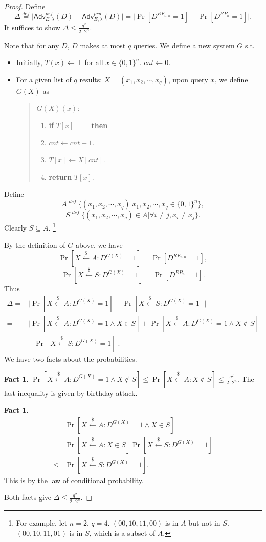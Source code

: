 \documentclass[12pt]{article}
\newcommand{\eqdef}{\stackrel{def}{=}}
\newcommand{\bits}{\{0,1\}}
\newcommand{\getsr}{\stackrel{\$}{\gets}}
\newcommand{\Adv}{\mathsf{Adv}}
\newcommand{\tab}{\hspace{0.3in}}
\theoremstyle{definition}
\newtheorem{fact}[theorem]{Fact}
\begin{document}
\begin{proof}
Define
$$
\Delta \eqdef \bigg| \Adv_{E,\lambda}^{prf}(D) - \Adv_{E,\lambda}^{prp}(D) \bigg| 
= \bigg| \Pr[D^{RF_{n,n}}=1] - \Pr[D^{RP_n}=1] \bigg|.
$$
It suffices to show $\Delta \leq \frac{q^2}{2 \cdot 2^n}$. 

Note that for any $D$, $D$ makes at most $q$ queries. We define a new system $G$ s.t.
\begin{itemize}
\item Initially, $T(x) \gets \bot$ for all $x \in \bits^n$. $cnt \gets 0$.
\item For a given list of $q$ results: $X = (x_1, x_2, \cdots, x_q)$, upon query $x$, we define $G(X)$ as
\begin{quote}
$G(X)(x)$:
\begin{enumerate}
\item {\bf if} $T[x] = \bot$ {\bf then}
\item \tab $cnt \gets cnt + 1$.
\item \tab $T[x] \gets X[cnt]$.
\item {\bf return} $T[x]$.
\end{enumerate}
\end{quote}
\end{itemize}

Define
$$A \eqdef \{(x_1,x_2,\cdots,x_q) | x_1,x_2,\cdots,x_q \in \bits^n \},$$
$$S \eqdef \{(x_1,x_2,\cdots,x_q) \in A | \forall i \not= j, x_i \not= x_j \}. $$
Clearly $S\subseteq A$. \footnote{For example, let $n=2$, $q=4$. $(00, 10, 11, 00)$ is in $A$ but not in $S$. $(00, 10, 11, 01)$ is in $S$, which is a subset of $A$.}

By the definition of $G$ above, we have
$$\Pr[X \getsr A : D^{G(X)}=1] = \Pr[D^{RF_{n,n}}=1],$$
$$\Pr[X \getsr S : D^{G(X)}=1] = \Pr[D^{RP_n}=1].$$
Thus
$$\begin{aligned}
\Delta = & \bigg| \Pr[X \getsr A : D^{G(X)}=1] - \Pr[X \getsr S : D^{G(X)}=1] \bigg| \\
=& \bigg| \Pr[X \getsr A : D^{G(X)}=1 \wedge X \in S] + \Pr[X \getsr A : D^{G(X)}=1 \wedge X \not\in S] \\
& - \Pr[X \getsr S : D^{G(X)}=1] \bigg|.
\end{aligned}$$
We have two facts about the probabilities.
\begin{fact}
$\Pr [X \getsr A : D^{G(X)}=1 \wedge X \not\in S] \leq \Pr [X \getsr A : X \not\in S] \leq \frac{q^2}{2 \cdot 2^n}$. The last inequality is given by birthday attack.
\end{fact}

\begin{fact}
$$\begin{aligned}
& \Pr[X \getsr A : D^{G(X)}=1 \wedge X \in S] \\
= & \Pr[X \getsr A : X \in S] \Pr[X \getsr S : D^{G(X)}=1] \\
\leq &\Pr[X \getsr S : D^{G(X)}=1].
\end{aligned}$$
This is by the law of conditional probability.
\end{fact}
Both facts give $\Delta \leq \frac{q^2}{2 \cdot 2^n}$.
\end{proof}
\end{document}
